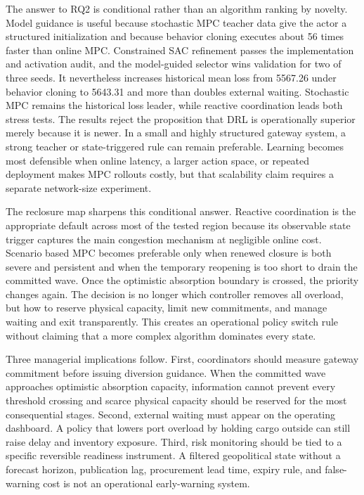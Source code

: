 \documentclass[a4paper,fleqn]{cas-sc}
\begin{document}
The answer to RQ2 is conditional rather than an algorithm ranking by novelty.
Model guidance is useful because stochastic MPC teacher data give the actor a
structured initialization and because behavior cloning executes about 56 times
faster than online MPC. Constrained SAC refinement passes the implementation and
activation audit, and the model-guided selector wins validation for two of three
seeds. It nevertheless increases historical mean loss from 5567.26 under
behavior cloning to 5643.31 and more than doubles external waiting. Stochastic
MPC remains the historical loss leader, while reactive coordination leads both
stress tests. The results reject the proposition that DRL is operationally
superior merely because it is newer. In a small and highly structured gateway
system, a strong teacher or state-triggered rule can remain preferable. Learning
becomes most defensible when online latency, a larger action space, or repeated
deployment makes MPC rollouts costly, but that scalability claim requires a
separate network-size experiment.

The reclosure map sharpens this conditional answer. Reactive coordination is the
appropriate default across most of the tested region because its observable
state trigger captures the main congestion mechanism at negligible online
cost. Scenario based MPC becomes preferable only when renewed closure is both
severe and persistent and when the temporary reopening is too short to drain
the committed wave. Once the optimistic absorption boundary is crossed, the
priority changes again. The decision is no longer which controller removes all
overload, but how to reserve physical capacity, limit new commitments, and
manage waiting and exit transparently. This creates an operational policy switch
rule without claiming that a more complex algorithm dominates every state.

Three managerial implications follow. First, coordinators should measure
gateway commitment before issuing diversion guidance. When the committed wave
approaches optimistic absorption capacity, information cannot prevent every
threshold crossing and scarce physical capacity should be reserved for the most
consequential stages. Second, external waiting must appear on the operating
dashboard. A policy that lowers port overload by holding cargo outside can still
raise delay and inventory exposure. Third, risk monitoring should be tied to a
specific reversible readiness instrument. A filtered geopolitical state without
a forecast horizon, publication lag, procurement lead time, expiry rule, and
false-warning cost is not an operational early-warning system.
\end{document}
